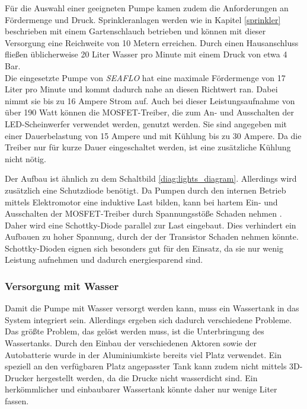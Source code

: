 Für die Auswahl einer geeigneten Pumpe kamen zudem die Anforderungen an Fördermenge und Druck. Sprinkleranlagen werden wie in Kapitel \ref{sprinkler} beschrieben mit einem Gartenschlauch betrieben und können mit dieser Versorgung eine Reichweite von 10 Metern erreichen. Durch einen Hausanschluss fließen üblicherweise 20 Liter Wasser pro Minute mit einem Druck von etwa 4 Bar.\\
Die eingesetzte Pumpe von \textit{SEAFLO} hat eine maximale Fördermenge von 17 Liter pro Minute und kommt dadurch nahe an diesen Richtwert ran. Dabei nimmt sie bis zu 16 Ampere Strom auf. Auch bei dieser Leistungsaufnahme von über 190 Watt können die MOSFET-Treiber, die zum An- und Ausschalten der LED-Scheinwerfer verwendet werden, genutzt werden. Sie sind angegeben mit einer Dauerbelastung von 15 Ampere und mit Kühlung bis zu 30 Ampere. Da die Treiber nur für kurze Dauer eingeschaltet werden, ist eine zusätzliche Kühlung nicht nötig. \cite{mosfets_am,seaflo_pump}

Der Aufbau ist ähnlich zu dem Schaltbild \ref{diag:lights_diagram}. Allerdings wird zusätzlich eine Schutzdiode benötigt. Da Pumpen durch den internen Betrieb mittels Elektromotor eine induktive Last bilden, kann bei hartem Ein- und Ausschalten der MOSFET-Treiber durch Spannungsstöße Schaden nehmen \cite{induktive_last_diode}. Daher wird eine Schottky-Diode parallel zur Last eingebaut. Dies verhindert ein Aufbauen zu hoher Spannung, durch der der Transistor Schaden nehmen könnte. Schottky-Dioden eignen sich besonders gut für den Einsatz, da sie nur wenig Leistung aufnehmen und dadurch energiesparend sind. \cite{induktive_last_diode,am_schottky}

\subsubsection{Versorgung mit Wasser}

Damit die Pumpe mit Wasser versorgt werden kann, muss ein Wassertank in das System integriert sein. Allerdings ergeben sich dadurch verschiedene Probleme.
\\
Das größte Problem, das gelöst werden muss, ist die Unterbringung des Wassertanks. Durch den Einbau der verschiedenen Aktoren sowie der Autobatterie wurde in der Aluminiumkiste bereits viel Platz verwendet. Ein speziell an den verfügbaren Platz angepasster Tank kann zudem nicht mittels 3D-Drucker hergestellt werden, da die Drucke nicht wasserdicht sind. Ein herkömmlicher und einbaubarer Wassertank könnte daher nur wenige Liter fassen.

